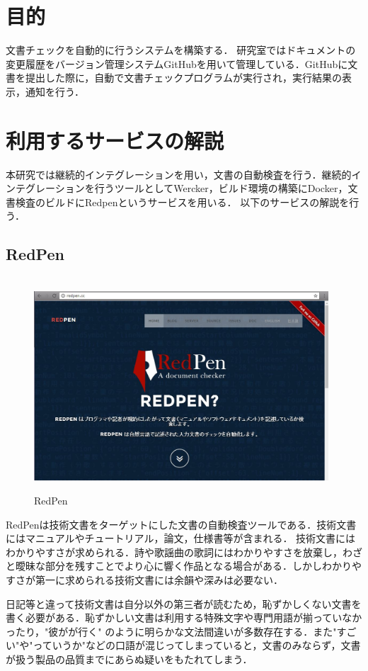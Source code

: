 \chapter{目的}
文書チェックを自動的に行うシステムを構築する．
研究室ではドキュメントの変更履歴をバージョン管理システムGitHubを用いて管理している．GitHubに文書を提出した際に，自動で文書チェックプログラムが実行され，実行結果の表示，通知を行う．


\chapter{利用するサービスの解説}
本研究では継続的インテグレーションを用い，文書の自動検査を行う．継続的インテグレーションを行うツールとしてWercker，ビルド環境の構築にDocker，文書検査のビルドにRedpenというサービスを用いる．
以下のサービスの解説を行う．


\section{RedPen}
\begin{figure}[htb]
\centering　
\includegraphics[width=11cm]{28.JPG}
\caption{RedPen}\label{tab:uac}
\end{figure}
RedPenは技術文書をターゲットにした文書の自動検査ツールである．技術文書にはマニュアルやチュートリアル，論文，仕様書等が含まれる．
技術文書にはわかりやすさが求められる．詩や歌謡曲の歌詞にはわかりやすさを放棄し，わざと曖昧な部分を残すことでより心に響く作品となる場合がある．しかしわかりやすさが第一に求められる技術文書には余韻や深みは必要ない．

日記等と違って技術文書は自分以外の第三者が読むため，恥ずかしくない文書を書く必要がある．恥ずかしい文書は利用する特殊文字や専門用語が揃っていなかったり，"彼がが行く" のように明らかな文法間違いが多数存在する．また"すごい"や"っていうか"などの口語が混じってしまっていると，文書のみならず，文書が扱う製品の品質までにあらぬ疑いをもたれてしまう．

